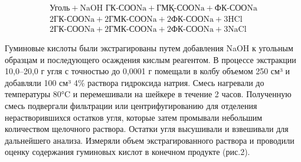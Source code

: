 \begin{equation}
\begin{aligned}
\text{Уголь} + \text{NaOH} \text{ ГК-СООNa} + \text{ГМҚ-СООNa} + \text{ФК-СООNa}\\
2\text{ГК-СООNa} + 2\text{ГМК-СООNa} + 2\text{ФК-СООNa} + 3\text{HCl}\\
2\text{ГК-СООNa} + 2\text{ГМК-СООNa} + 2\text{ФК-СООNa} + 3\text{NaCl}
\end{aligned}
\end{equation}

\begin{multicols}{2}
Гуминовые кислоты были экстрагированы путем добавления NaOH к угольным
образцам и последующего осаждения кислым реагентом. В процессе
экстракции 10,0--20,0 г угля с точностью до 0,0001 г помещали в колбу
объемом 250 см³ и добавляли 100 см³ 4\% раствора гидроксида натрия.
Смесь нагревали до температуры 80°C и перемешивали на шейкере в течение
2 часов. Полученную смесь подвергали фильтрации или центрифугированию
для отделения нерастворившихся остатков угля, которые затем промывали
небольшим количеством щелочного раствора. Остатки угля высушивали и
взвешивали для дальнейшего анализа. Измеряли объем экстрагированного
раствора и проводили оценку содержания гуминовых кислот в конечном
продукте (рис.2).
\end{multicols}

